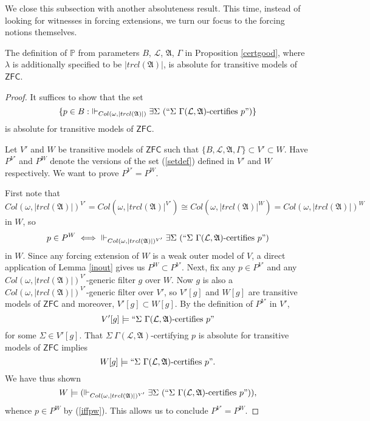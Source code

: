 \documentclass[12pt]{article}
\numberwithin{equation}{section}
\begin{document}
We close this subsection with another absoluteness result. This time, instead of looking for witnesses in forcing extensions, we turn our focus to the forcing notions themselves.

\begin{lem}\label{Pisabs}
The definition of $\mathbb{P}$ from parameters $B$, $\mathcal{L}$, $\mathfrak{A}$, $\Gamma$ in Proposition \ref{certgood}, where $\lambda$ is additionally specified to be $|trcl(\mathfrak{A})|$, is absolute for transitive models of $\mathsf{ZFC}$.
\end{lem}

\begin{proof}
It suffices to show that the set 
\begin{equation}\label{setdef}
    \{p \in B : \ \Vdash_{Col(\omega, |trcl(\mathfrak{A})|)} \exists \Sigma \ (``\Sigma \ \Gamma(\mathcal{L}, \mathfrak{A}) \text{-certifies } p")\}
\end{equation}
is absolute for transitive models of $\mathsf{ZFC}$. 

Let $V'$ and $W$ be transitive models of $\mathsf{ZFC}$ such that $\{B, \mathcal{L}, \mathfrak{A}, \Gamma\} \subset V' \subset W$. Have $P^{V'}$ and $P^W$ denote the versions of the set (\ref{setdef}) defined in $V'$ and $W$ respectively. We want to prove $P^{V'} = P^W$. 

First note that $$ Col(\omega, |trcl(\mathfrak{A})|)^{V'} = Col(\omega, |trcl(\mathfrak{A})|^{V'}) \cong Col(\omega, |trcl(\mathfrak{A})|^W) = Col(\omega, |trcl(\mathfrak{A})|)^W$$ in $W$, so 
\begin{equation}\label{iffpw}
    p \in P^W \iff \ \Vdash_{Col(\omega, |trcl(\mathfrak{A})|)^{V'}} \exists \Sigma \ (``\Sigma \ \Gamma(\mathcal{L}, \mathfrak{A}) \text{-certifies } p")
\end{equation}
in $W$. Since any forcing extension of $W$ is a weak outer model of $V$, a direct application of Lemma \ref{inout} gives us $P^W \subset P^{V'}$. Next, fix any $p \in P^{V'}$ and any $Col(\omega, |trcl(\mathfrak{A})|)^{V'}$-generic filter $g$ over $W$. Now $g$ is also a $Col(\omega, |trcl(\mathfrak{A})|)^{V'}$-generic filter over $V'$, so $V'[g]$ and $W[g]$ are transitive models of $\mathsf{ZFC}$ and moreover, $V'[g] \subset W[g]$. By the definition of $P^{V'}$ in $V'$, $$V'[g] \models ``\Sigma \ \Gamma(\mathcal{L}, \mathfrak{A}) \text{-certifies } p"$$ for some $\Sigma \in V'[g]$. That $\Sigma \ \Gamma(\mathcal{L}, \mathfrak{A})$-certifying $p$ is absolute for transitive models of $\mathsf{ZFC}$ implies $$W[g] \models ``\Sigma \ \Gamma(\mathcal{L}, \mathfrak{A}) \text{-certifies } p".$$ We have thus shown $$W \models (\Vdash_{Col(\omega, |trcl(\mathfrak{A})|)^{V'}} \exists \Sigma \ (``\Sigma \ \Gamma(\mathcal{L}, \mathfrak{A}) \text{-certifies } p")),$$ whence $p \in P^W$ by (\ref{iffpw}). This allows us to conclude $P^{V'} = P^W$.
\end{proof}
\end{document}
